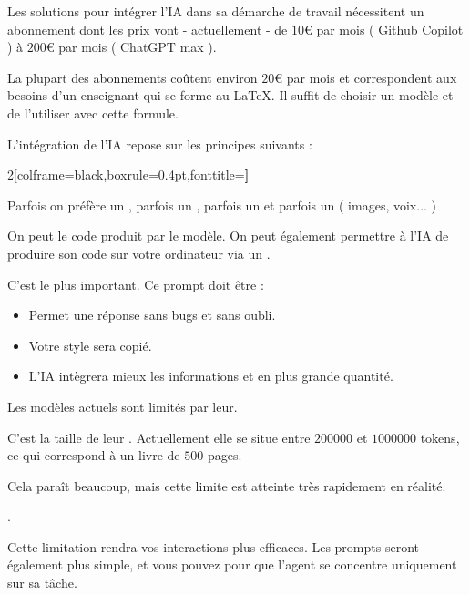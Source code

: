 \bcattention Les solutions pour intégrer l'IA dans sa démarche de travail nécessitent un abonnement dont les prix vont - actuellement - de $10$\euro{} par mois ( Github Copilot ) à $200$\euro{} par mois ( ChatGPT max ).

La plupart des abonnements  coûtent environ $20$\euro{} par mois et correspondent aux besoins d'un enseignant qui se forme au \LaTeX. 
Il suffit de choisir un modèle et de l'utiliser avec cette formule. 
\begin{Methode}
    L'intégration de l'IA repose sur les principes suivants : 


    \begin{MultiColonnes}{2}[colframe=black,boxrule=0.4pt,fonttitle=\bfseries]%

        \tcbitem[title=Un modèle] Parfois on préfère un , parfois un , parfois un  et parfois un  ( images, voix... )

        \tcbitem[title=Un système d'intégration] On peut  le code produit par le modèle. On peut également permettre à l'IA de produire son code sur votre ordinateur via un .

        \tcbitem[raster multicolumn=2, title=Des prompts] C'est le plus important. Ce prompt doit être : 
        \begin{itemize}[label=$\bullet$]
            \item {} \hfill Permet une réponse sans bugs et sans oubli.
            \item {} \hfill Votre style sera copié.
            \item {} \hfill L'IA intègrera mieux les informations et en plus grande quantité.
        \end{itemize}
    \end{MultiColonnes}
    \bcattention Les modèles actuels sont limités par leur. 

    C'est la taille de leur . Actuellement elle se situe entre $\num{200000}$ et $\num{1000000}$ tokens, ce qui correspond à un livre de $500$ pages.

    Cela paraît beaucoup, mais cette limite est atteinte très rapidement en réalité. 

    . 

    Cette limitation rendra vos interactions plus efficaces. Les prompts seront également plus simple, et vous pouvez  pour que l'agent se concentre uniquement sur sa tâche. 
\end{Methode}

